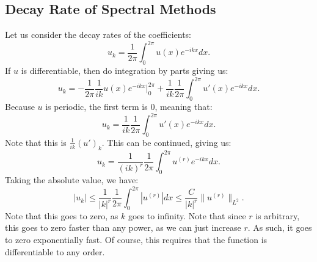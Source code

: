 \documentclass[../main/main.tex]{subfiles}
\begin{document}
    \subsection{Decay Rate of Spectral Methods}
    Let us consider the decay rates of the coefficients: \[
        u_k = \frac{1}{2\pi}\int ^{2\pi}_0 u(x) e^{-ikx}dx
    .\] If $u$ is differentiable, then do integration by parts giving us: \[
u_k = -\frac{1}{2\pi} \frac{1}{ik}u(x) e^{-ikx}\bigg\rvert ^{2\pi}_0 + \frac{1}{ik} \frac{1}{2\pi}\int ^{2\pi}_0u'(x) e^{-ikx}dx
    .\]  Because $u$ is periodic, the first term is 0, meaning that: \[
    u_k = \frac{1}{ik} \frac{1}{2\pi}\int ^{2\pi}_0 u'(x) e^{-ikx}dx 
    .\] Note that this is $\frac{1}{ik}(u')_k$. This can be continued, giving us: \[
    u_k = \frac{1}{(ik)^r} \frac{1}{2\pi}\int ^{2\pi}_0 u^{(r)}e^{-ikx}dx
    .\]  Taking the absolute value, we have: \[
    |u_k| \le  \frac{1}{|k|^r} \frac{1}{2\pi} \int ^{2\pi}_0 |u^{(r)}| dx \le  \frac{C}{|k|^r} \| u^{(r)}\|_{L^2}
    .\] 
    Note that this goes to zero, as $k$ goes to infinity. Note that since $r$ is arbitrary, this goes to zero faster than any power, as we can just increase  $r$. As such, it goes to zero exponentially fast. Of course, this requires that the function is differentiable to any order. \\
\end{document}
